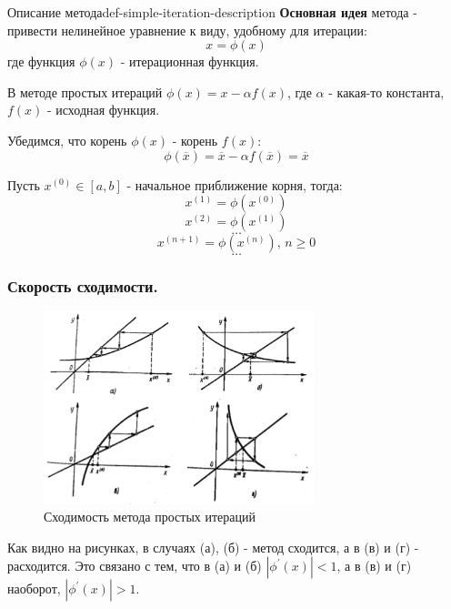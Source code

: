 \documentclass[14pt]{extarticle}
\begin{document}
        \begin{definition}{Описание метода}{def-simple-iteration-description}
            \textbf{Основная идея} метода - привести нелинейное уравнение к виду, удобному для итерации:
            $$x = \phi(x)$$
            где функция $\phi(x)$ - итерационная функция.
            
            \vspace{\baselineskip}

            В методе простых итераций $\phi(x) = x - \alpha f(x)$, где $\alpha$ - какая-то константа, $f(x)$ - исходная функция. 
            
            Убедимся, что корень $\phi(x)$ - корень $f(x)$: 
            $$\phi(\overline{x}) = \overline{x} - \alpha f(\overline{x}) = \overline{x}$$

            Пусть $x^{(0)} \in [a, b]$ - начальное приближение корня, тогда:
            $$x^{(1)} = \phi(x^{(0)})$$
            $$x^{(2)} = \phi(x^{(1)})$$
            $$\ldots$$
            $$x^{(n + 1)} = \phi(x^{(n)}) \text{, } n \geq 0$$
            $$\ldots$$
        \end{definition}

    \subsubsection{Скорость сходимости.}

        \begin{figure}[H]
            \centering
            \includegraphics[width=0.7\textwidth]{images/simple-iterations-convergence.png}
            \caption{Сходимость метода простых итераций}
            \label{fig:simple-iterations-example}
        \end{figure}

        Как видно на рисунках, в случаях (а), (б) - метод сходится, а в (в) и (г) - расходится. Это связано с тем, что в (а) и (б) $|\phi^{'}(x)| < 1$, а в (в) и (г) наоборот, $|\phi^{'}(x)| > 1$.
\end{document}
